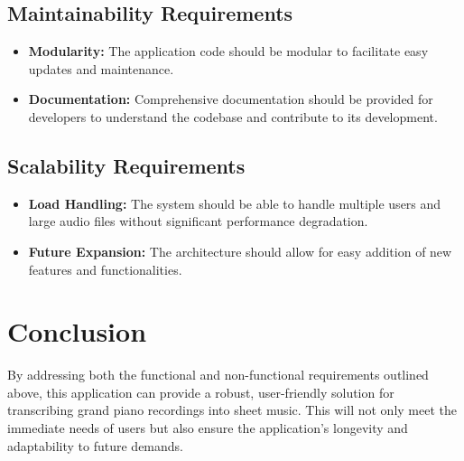 \documentclass{article}
\begin{document}
\subsection{Maintainability Requirements}
\begin{itemize}
    \item \textbf{Modularity:} The application code should be modular to facilitate easy updates and maintenance.
    \item \textbf{Documentation:} Comprehensive documentation should be provided for developers to understand the codebase and contribute to its development.
\end{itemize}

\subsection{Scalability Requirements}
\begin{itemize}
    \item \textbf{Load Handling:} The system should be able to handle multiple users and large audio files without significant performance degradation.
    \item \textbf{Future Expansion:} The architecture should allow for easy addition of new features and functionalities.
\end{itemize}

\section{Conclusion}
By addressing both the functional and non-functional requirements outlined above, this application can provide a robust, user-friendly solution for transcribing grand piano recordings into sheet music. This will not only meet the immediate needs of users but also ensure the application's longevity and adaptability to future demands.
\end{document}
